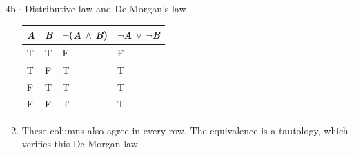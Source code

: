 \documentclass[11pt]{article}
\begin{document}
\begin{keepsection}
\begin{workedbox}{4b \ensuremath{\cdot} Distributive law and De Morgan’s law}
\begin{enumerate}
\begin{center}\small\begin{tabularx}{\linewidth}{>{\raggedright\arraybackslash}X>{\raggedright\arraybackslash}X>{\raggedright\arraybackslash}X>{\raggedright\arraybackslash}X}\toprule
\textbf{\textit{A}} & \textbf{\textit{B}} & \textbf{\ensuremath{\neg}(\textit{A} \ensuremath{\land} \textit{B})} & \textbf{\ensuremath{\neg}\textit{A} \ensuremath{\lor} \ensuremath{\neg}\textit{B}} \\ \midrule
T & T & F & F \\
T & F & T & T \\
F & T & T & T \\
F & F & T & T \\
\bottomrule\end{tabularx}\end{center}
\item These columns also agree in every row. The equivalence is a tautology, which verifies this De Morgan law.
\end{enumerate}
\end{workedbox}

\end{keepsection}
\end{document}
